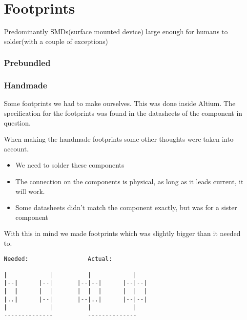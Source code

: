 \documentclass[../main/report.tex]{subfiles}
\begin{document}














\section{Footprints}
Predominantly SMDs(surface mounted device) large enough for humans to solder(with a couple of exceptions)




\subsubsection{Prebundled}

\subsubsection{Handmade}
Some footprints we had to make ourselves.
This was done inside Altium.
The specification for the footprints was found in the datasheets of the component in question.

When making the handmade footprints some other thoughts were taken into account.

\begin{itemize}
    \item We need to solder these components
    \item The connection on the components is physical, as long as it leads current, it will work.
    \item Some datasheets didn't match the component exactly, but was for a sister component
\end{itemize}

With this in mind we made footprints which was slightly bigger than it needed to.

\begin{verbatim}
Needed:                 Actual:
--------------          --------------
|            |          |            |
|--|      |--|       |--|--|      |--|--|
|  |      |  |       |  |  |      |  |  |
|..|      |--|       |--|..|      |--|--|
|            |          |            |
--------------          --------------
\end{verbatim}
\end{document}
